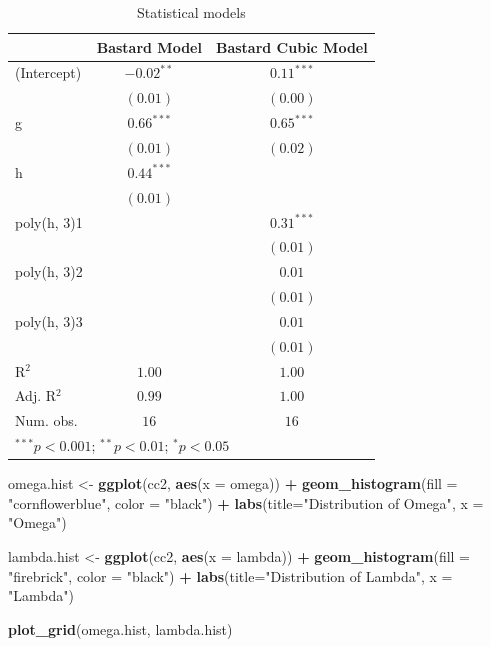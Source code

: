 \documentclass[10pt]{article}
\newenvironment{Shaded}{\begin{snugshade}}{\end{snugshade}}
\newcommand{\AttributeTok}[1]{\textcolor[rgb]{0.13,0.29,0.53}{#1}}
\newcommand{\FunctionTok}[1]{\textcolor[rgb]{0.13,0.29,0.53}{\textbf{#1}}}
\newcommand{\NormalTok}[1]{#1}
\newcommand{\OtherTok}[1]{\textcolor[rgb]{0.56,0.35,0.01}{#1}}
\newcommand{\SpecialCharTok}[1]{\textcolor[rgb]{0.81,0.36,0.00}{\textbf{#1}}}
\newcommand{\StringTok}[1]{\textcolor[rgb]{0.31,0.60,0.02}{#1}}
\begin{document}
\begin{table}
\caption{Statistical models}
\begin{center}
\begin{tabular}{l c c}
\hline
 & Bastard Model & Bastard Cubic Model \\
\hline
(Intercept) & $-0.02^{**}$ & $0.11^{***}$ \\
            & $(0.01)$     & $(0.00)$     \\
g           & $0.66^{***}$ & $0.65^{***}$ \\
            & $(0.01)$     & $(0.02)$     \\
h           & $0.44^{***}$ &              \\
            & $(0.01)$     &              \\
poly(h, 3)1 &              & $0.31^{***}$ \\
            &              & $(0.01)$     \\
poly(h, 3)2 &              & $0.01$       \\
            &              & $(0.01)$     \\
poly(h, 3)3 &              & $0.01$       \\
            &              & $(0.01)$     \\
\hline
R$^2$       & $1.00$       & $1.00$       \\
Adj. R$^2$  & $0.99$       & $1.00$       \\
Num. obs.   & $16$         & $16$         \\
\hline
\multicolumn{3}{l}{\scriptsize{$^{***}p<0.001$; $^{**}p<0.01$; $^{*}p<0.05$}}
\end{tabular}
\label{table:coefficients}
\end{center}
\end{table}

\begin{Shaded}
\begin{Highlighting}[]
\NormalTok{omega.hist }\OtherTok{\textless{}{-}} \FunctionTok{ggplot}\NormalTok{(cc2, }\FunctionTok{aes}\NormalTok{(}\AttributeTok{x =}\NormalTok{ omega)) }\SpecialCharTok{+}
  \FunctionTok{geom\_histogram}\NormalTok{(}\AttributeTok{fill =} \StringTok{"cornflowerblue"}\NormalTok{, }
                 \AttributeTok{color =} \StringTok{"black"}\NormalTok{) }\SpecialCharTok{+} 
  \FunctionTok{labs}\NormalTok{(}\AttributeTok{title=}\StringTok{"Distribution of Omega"}\NormalTok{,}
       \AttributeTok{x =} \StringTok{"Omega"}\NormalTok{) }

\NormalTok{lambda.hist }\OtherTok{\textless{}{-}} \FunctionTok{ggplot}\NormalTok{(cc2, }\FunctionTok{aes}\NormalTok{(}\AttributeTok{x =}\NormalTok{ lambda)) }\SpecialCharTok{+}
  \FunctionTok{geom\_histogram}\NormalTok{(}\AttributeTok{fill =} \StringTok{"firebrick"}\NormalTok{, }
                 \AttributeTok{color =} \StringTok{"black"}\NormalTok{) }\SpecialCharTok{+} 
  \FunctionTok{labs}\NormalTok{(}\AttributeTok{title=}\StringTok{"Distribution of Lambda"}\NormalTok{,}
       \AttributeTok{x =} \StringTok{"Lambda"}\NormalTok{)}

\FunctionTok{plot\_grid}\NormalTok{(omega.hist, lambda.hist)}
\end{Highlighting}
\end{Shaded}
\end{document}
